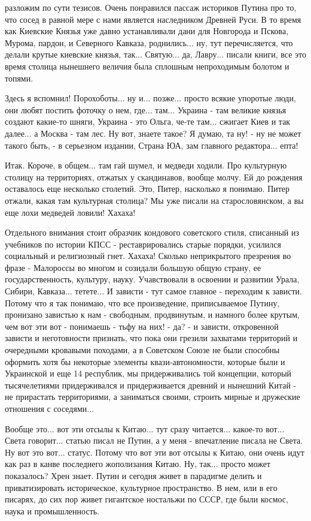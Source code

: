 разложим по сути тезисов. Очень понравился пассаж историков Путина про то, что сосед 
в равной мере с нами является наследником Древней Руси. В то время как Киевские Князья уже 
давно устанавливали дани для Новгорода и Пскова, Мурома, пардон, и Северного Кавказа, роднились... 
ну, тут перечисляется, что делали крутые киевские князья, так... Святую... да, Лавру... писали книги,
все это время столица нынешнего величия была сплошным непроходимым болотом и топями. 

Здесь я вспомнил! Порохоботы... ну и... позже... просто всякие упоротые люди, они любят постить фоточку
о нем, где... там... Украина - там великие князья создают какие-то шняги, Украина - это Ольга, че-те там...
сжигает Киев и так далее... а Москва - там лес. Ну вот, знаете такое? Я думаю, та ну! - ну не может такого быть, - 
в серьезном издании, Страна ЮА, зам главного редактора... епта! 

Итак. Короче, в общем... там гай шумел, и медведи ходили. Про культурную столицу на территориях,
отжатых у скандинавов, вообще молчу. Ей до рождения оставалось еще несколько столетий. Это, Питер, насколько 
я понимаю. Питер отжали, какая там культурная столица? Мы уже писали на старословянском, а вы еще лохи
медведей ловили! Хахаха!

Отдельного внимания стоит образчик кондового советского стиля, списанный из учебников по истории КПСС - реставрировались 
старые порядки, усилился социальный и религиозный гнет. Хахаха! Сколько неприкрытого презрения во фразе - 
Малороссы во многом и созидали большую общую страну, ее государственность, культуру, науку. Учавствовали в освоении и развитии
Урала, Сибири, Кавказа... тетете... И зависти - тут самое главное - переходим к зависти. Потому что я так понимаю,
что все произведение, приписываемое Путину, пронизано завистью к нам - свободным, продвинутым, и намного более
крутым, чем вот эти вот - понимаешь - тьфу на них! - да? - и зависти, откровенной зависти и неготовности признать, 
что пока они грезили захватами территорий и очередными кровавыми походами, а в Советском Союзе не были способны
оформить хотя бы некоторые элементы квази-автономности, которые были и Украинской и еще 14 республик, 
мы придерживались той концепции, который тысячелетиями придерживался и придерживается древний и нынешний Китай - 
не прирастать территориями, а заниматься своими, строить мирные и дружеские отношения с соседями... 

Вообще это... вот эти отсылы к Китаю... тут сразу читается... какое-то вот... Света говорит... 
статью писал не Путин, а у меня - впечатление писала не Света. Ну вот это вот... статус. Потому что вот эти вот 
отсылы к Китаю, они очень идут как раз в канве последнего жополизания Китаю. Ну, так... просто может показалось?
Хрен знает. Путин и сегодня живет в парадигме делить и приватизировать историческое, культурное пространство. 
В нем, или в его писарях, до сих пор живет гигантское ностальжи по СССР, где были космос, наука и промышленность.


